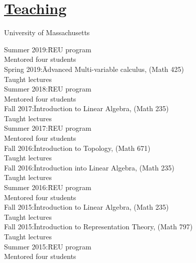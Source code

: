 \documentclass[11pt]{amsart}
\theoremstyle{plain}
\theoremstyle{definition}
\theoremstyle{remark}
\begin{document}
\section*{ {\Large\underline{Teaching}}}
\noindent University of Massachusetts
\begin{tabbing}



Summer 2019:\quad\= REU program\\
\>Mentored four students \\
  
  
Spring 2019:\quad\quad\= Advanced Multi-variable calculus, (Math 425)\\
\>Taught lectures \\


Summer 2018:\quad\= REU program\\
\>Mentored four students \\

  
Fall 2017:\quad\quad\quad\= Introduction to Linear Algebra, (Math 235)\\
\>Taught lectures \\


Summer 2017:\quad\= REU program\\
\>Mentored four students \\



  
Fall 2016:\quad\quad\quad\= Introduction to Topology, (Math 671)\\
\>Taught lectures \\


Fall 2016:\quad\quad\quad\= Introduction into Linear Algebra, (Math 235)\\
\>Taught lectures \\

Summer 2016:\quad\= REU program\\
\>Mentored four students \\

Fall 2015:\quad\quad\quad\= Introduction to Linear Algebra, (Math 235)\\
\>Taught lectures \\


Fall 2015:\quad\quad\quad\= Introduction to Representation Theory, (Math 797)\\
\>Taught lectures \\

Summer 2015:\quad\= REU program\\
\>Mentored four students \\


\end{tabbing}
\end{document}
